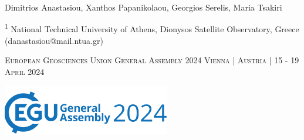 \documentclass[landscape,a0paper,fontscale=0.346]{baposter} %
\begin{document}
\begin{poster}
{\large Dimitrios Anastasiou, Xanthos Papanikolaou, Georgios Serelis, Maria Tsakiri 
{\small \par{\textsuperscript{1} National Technical University of Athens, Dionysos Satellite Observatory, Greece (danastasiou@mail.ntua.gr)} 
} \vspace{0.3em}
\par{\textsc{European Geosciences Union General Assembly 2024 Vienna | Austria | 15 - 19 April 2024}} 
\vskip 0.2cm

 }
{\includegraphics[height=6em]{../../logos/egu24_logo.png}} %




\end{poster}
\end{document}
